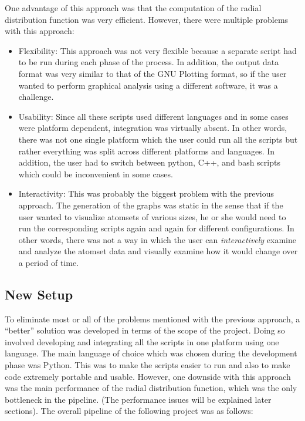 One advantage of this approach was that the computation of the radial distribution function was very efficient. However, there were multiple problems with this approach:

\begin{itemize}
    \item Flexibility: This approach was not very flexible because a separate script had to be run during each phase of the process. In addition, the output data format was very similar to that of the GNU Plotting format, so if the user wanted to perform graphical analysis using a different software, it was a challenge.
    
    \item Usability: Since all these scripts used different languages and in some cases were platform dependent, integration was virtually absent. In other words, there was not one single platform which the user could run all the scripts but rather everything was split across different platforms and languages. In addition, the user had to switch between python, C++, and bash scripts which could be inconvenient in some cases. 
    
    \item Interactivity: This was probably the biggest problem with the previous approach. The generation of the graphs was static in the sense that if the user wanted to visualize atomsets of various sizes, he or she would need to run the corresponding scripts again and again for different configurations. In other words, there was not a way in which the user can \textit{interactively} examine and analyze the atomset data and visually examine how it would change over a period of time.
\end{itemize}

\subsection*{New Setup}

To eliminate most or all of the problems mentioned with the previous approach, a ``better'' solution was developed in terms of the scope of the project. Doing so involved developing and integrating all the scripts in one platform using one language. The main language of choice which was chosen during the development phase was Python. This was to make the scripts easier to run and also to make code extremely portable and usable. However, one downside with this approach was the main performance of the radial distribution function, which was the only bottleneck in the pipeline. (The performance issues will be explained later sections). The overall pipeline of the following project was as follows:


